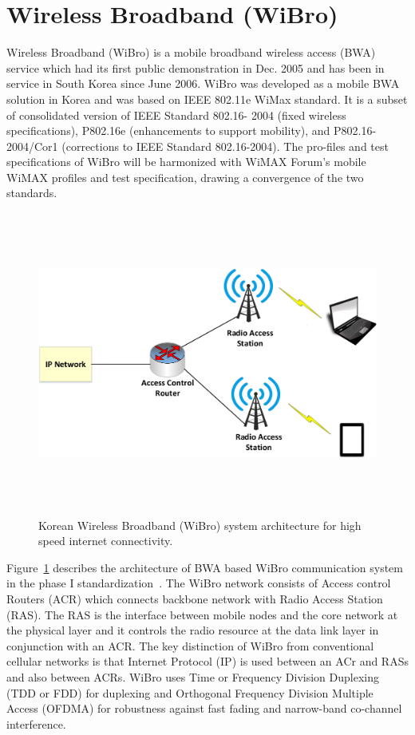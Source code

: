 \section{Wireless Broadband (WiBro)}

Wireless Broadband (WiBro) is a mobile broadband wireless access (BWA) service which had its first public demonstration in Dec. 2005 and has been in service in South Korea since June 2006. WiBro was developed as a mobile BWA solution in Korea and was based on IEEE 802.11e WiMax standard. It is a subset of consolidated version of IEEE Standard 802.16-
2004 (fixed wireless specifications), P802.16e (enhancements to support mobility), and P802.16-2004/Cor1 (corrections to IEEE Standard 802.16-2004). The pro-files and test specifications of WiBro will be harmonized with WiMAX Forum’s mobile WiMAX profiles and test specification, drawing a convergence of the two standards.


\begin{figure}[!ht]
\centering
\includegraphics[width=\textwidth,height=10cm,keepaspectratio]{images/Gill/5G/wibro.eps} 
\caption{Korean Wireless Broadband (WiBro) system architecture for high speed internet connectivity.}
\label{wibro}
\end{figure}

Figure~\ref{wibro} describes the architecture of BWA based WiBro communication system in the phase I standardization~\cite{wibro}. The WiBro network consists of Access control Routers (ACR) which connects backbone network with Radio Access Station (RAS). The RAS is the interface between mobile nodes and the core network at the physical layer and it controls the radio resource at the data link layer in conjunction with an ACR. The key distinction of WiBro from conventional cellular networks is that Internet Protocol (IP) is used between an ACr and RASs and also between ACRs. WiBro uses Time or Frequency Division Duplexing (TDD or FDD) for duplexing and Orthogonal Frequency Division Multiple Access (OFDMA) for robustness against fast fading and narrow-band co-channel interference.


